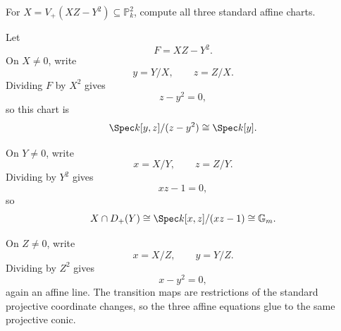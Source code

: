 \begin{problem}\label{prob:vi37-02}
For \(X=V_+(XZ-Y^2)\subseteq\mathbb P^2_k\), compute all three standard affine charts.
\end{problem}

\ifdefined\FullProblemDossiers
\begin{solution}
Let
\[
F=XZ-Y^2.
\]
On \(X\neq0\), write
\[
y=Y/X,\qquad z=Z/X.
\]
Dividing \(F\) by \(X^2\) gives
\[
z-y^2=0,
\]
so this chart is
\[
\Spec k[y,z]/(z-y^2)\cong\Spec k[y].
\]

On \(Y\neq0\), write
\[
x=X/Y,\qquad z=Z/Y.
\]
Dividing by \(Y^2\) gives
\[
xz-1=0,
\]
so
\[
X\cap D_+(Y)\cong\Spec k[x,z]/(xz-1)\cong\mathbb G_m.
\]

On \(Z\neq0\), write
\[
x=X/Z,\qquad y=Y/Z.
\]
Dividing by \(Z^2\) gives
\[
x-y^2=0,
\]
again an affine line. The transition maps are restrictions of the standard projective coordinate changes, so the three affine equations glue to the same projective conic.
\end{solution}
\fi
